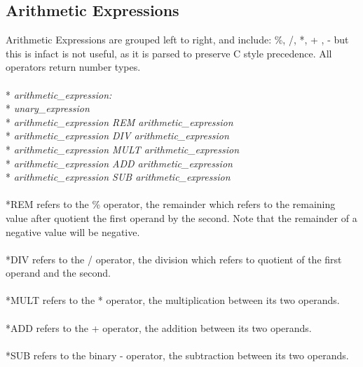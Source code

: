 \subsection{Arithmetic Expressions}
Arithmetic Expressions are grouped left to right, and include: \%, /, *, + , - but this is infact is not useful, as it is parsed to preserve C style precedence. All operators return number types.
\\ \\* \tab \emph{arithmetic\_expression:}
\\* \tab \tab \emph{unary\_expression}
\\* \tab \tab \emph{arithmetic\_expression REM arithmetic\_expression}
\\* \tab \tab \emph{arithmetic\_expression DIV arithmetic\_expression}
\\* \tab \tab \emph{arithmetic\_expression MULT arithmetic\_expression}
\\* \tab \tab \emph{arithmetic\_expression ADD arithmetic\_expression}
\\* \tab \tab \emph{arithmetic\_expression SUB arithmetic\_expression}
\\ \\*REM refers to the \% operator, the remainder which refers to the remaining value after quotient the first operand by the second. Note that the remainder of a negative value will be negative.
\\ \\*DIV refers to the / operator, the division which refers to quotient of the first operand and the second.
\\ \\*MULT refers to the * operator, the multiplication between its two operands.
\\ \\*ADD refers to the + operator, the addition between its two operands.
\\ \\*SUB refers to the binary - operator, the subtraction between its two operands.

